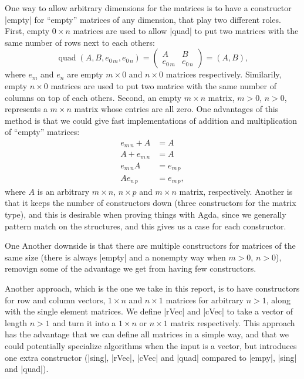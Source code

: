 \label{Section:Empty-Matrices}
One way to allow arbitrary dimensions for the matrices is to have a constructor |empty| for ``empty'' matrices of any dimension, that play two different roles. First, empty $0 \times n$ matrices are used to allow |quad| to put two matrices with the same number of rows next to each others:
\begin{equation}
\operatorname{quad}(A, B, e_{0\,m}, e_{0\,n}) =
\begin{pmatrix}
  A & B \\
  e_{0\,m} & e_{0\,n}
\end{pmatrix} = (A,  B),
\end{equation}
where $e_m$ and $e_n$ are empty $m \times 0$ and $n\times 0$ matrices respectively. Similarily, empty $n \times 0$ matrices are used to put two matrice with the same number of columns on top of each others. Second, an empty $m \times n$ matrix, $m > 0$, $n > 0$, represents a $m \times n$ matrix whose entries are all zero. One advantages of this method is that we could give fast implementations of  addition and multiplication of ``empty'' matrices:
\begin{align*}
  e_{m\, n} + A &= A \\ 
  A + e_{m\,n}  &= A \\
  e_{m\, n}   A &= e_{m\,p} \\
  A e_{n\,p}    &= e_{m\,p},
\end{align*}
where $A$ is an arbitrary $m \times n$, $n \times p$ and $m \times n$ matrix, respectively.
Another is that it keeps the number of constructors down (three constructors for the matrix type), and this is desirable when proving things with Agda, since we generally pattern match on the structures, and this gives us a case for each constructor.

One Another downside is that there are multiple constructors for matrices of the same size (there is always |empty| and a nonempty way when $m > 0$, $n > 0$), removign some of the advantage we get from having few constructors.

Another approach, which is the one we take in this report, is to have constructors for row and column vectors, $1 \times n$ and $n \times 1$ matrices for arbitrary $n > 1$, along with the single element matrices. We define |rVec| and |cVec| to take a vector of length $n > 1$ and turn it into a $1 \times n$ or $n \times 1$ matrix respectively.
This approach has the advantage that we can define all matrices in a simple way, and that we could potentially specialize algorithms when the input is a vector, but introduces one extra constructor (|sing|, |rVec|, |cVec| and |quad| compared to |empy|, |sing| and |quad|).


